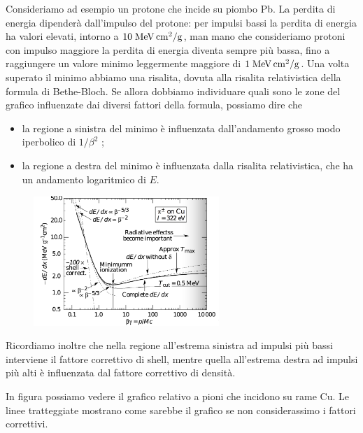 Consideriamo ad esempio un protone che incide su piombo Pb. La perdita di energia dipenderà dall'impulso del protone: per impulsi bassi la perdita di energia ha valori elevati, intorno a $10 \; \rm MeV \, cm^2/g$, man mano che consideriamo protoni con impulso maggiore la perdita di energia diventa sempre più bassa, fino a raggiungere un valore minimo leggermente maggiore di $1 \; \rm MeV \, cm^2/g$. Una volta superato il minimo abbiamo una risalita, dovuta alla risalita relativistica della formula di Bethe-Bloch. Se allora dobbiamo individuare quali sono le zone del grafico influenzate dai diversi fattori della 
formula, possiamo dire che

\begin{itemize}
    \item la regione a sinistra del minimo è influenzata dall'andamento grosso modo iperbolico di $1/\beta^2$ ;
    \item la regione a destra del minimo è influenzata dalla risalita relativistica, che ha un andamento logaritmico di $E$.
\end{itemize}

\begin{minipage}{0.465\textwidth}
    \begin{figure}[H]
        \centering
        \includegraphics[width=7cm]{immagini/correzioni_shell_densita.png}
    \end{figure}
\end{minipage}
\begin{minipage}{0.53\textwidth}
    \vspace{0.4cm}Ricordiamo inoltre che nella regione all'estrema sinistra ad impulsi più bassi interviene il fattore correttivo di shell, mentre quella all'estrema destra ad impulsi più alti è influenzata dal fattore correttivo di densità.

    In figura possiamo vedere il grafico relativo a pioni che incidono su rame Cu. Le linee tratteggiate mostrano come sarebbe il grafico se non considerassimo i fattori correttivi.
\end{minipage}

